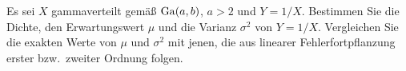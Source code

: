 
Es sei $X$ gammaverteilt gem\"a{\ss} $\mathrm{Ga}(a, b)$, $a > 2$ und $Y = 1/X$.
Bestimmen Sie die Dichte, den Erwartungswert $\mu$ und die Varianz
$\sigma^2$ von $Y = 1/X$.
Vergleichen Sie die exakten Werte von $\mu$ und $\sigma^2$ mit jenen,
die aus linearer Fehlerfortpflanzung erster bzw.~zweiter Ordnung folgen.


\answer{}
